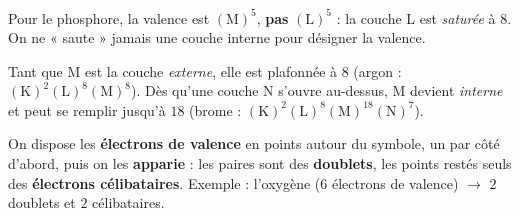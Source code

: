 \documentclass[11pt,a4paper]{article}
\begin{document}
\begin{piege}
Pour le phosphore, la valence est $(\mathrm{M})^5$, \textbf{pas} $(\mathrm{L})^5$ : la couche L est
\emph{saturée} à $8$. On ne « saute » jamais une couche interne pour désigner la valence.
\end{piege}

\begin{remarque}
Tant que M est la couche \emph{externe}, elle est plafonnée à $8$ (argon : $(\mathrm{K})^2(\mathrm{L})^8
(\mathrm{M})^8$). Dès qu'une couche N s'ouvre au-dessus, M devient \emph{interne} et peut se remplir
jusqu'à $18$ (brome : $(\mathrm{K})^2(\mathrm{L})^8(\mathrm{M})^{18}(\mathrm{N})^7$).
\end{remarque}

\begin{cle}
On dispose les \textbf{électrons de valence} en points autour du symbole, un par côté d'abord, puis on
les \textbf{apparie} : les paires sont des \textbf{doublets}, les points restés seuls des
\textbf{électrons célibataires}. Exemple : l'oxygène ($6$ électrons de valence) $\to$ $2$ doublets et
$2$ célibataires.
\end{cle}
\end{document}
